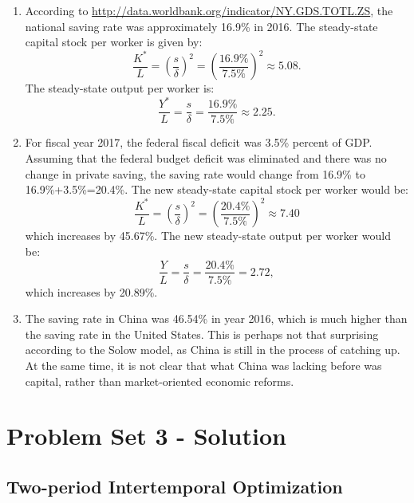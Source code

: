 \documentclass[]{book}
\begin{document}
\begin{enumerate}
\def\labelenumi{\arabic{enumi}.}
\item
  According to \url{http://data.worldbank.org/indicator/NY.GDS.TOTL.ZS},
  the national saving rate was approximately 16.9\% in 2016. The
  steady-state capital stock per worker is given by:
  \[\frac{K^{*}}{L}=\left(\frac{s}{\delta}\right)^{2}=\left(\frac{16.9\%}{7.5\%}\right)^{2} \approx 5.08.\]
  The steady-state output per worker is:
  \[\frac{Y^{*}}{L}=\frac{s}{\delta}=\frac{16.9\%}{7.5\%} \approx 2.25.\]
\item
  For fiscal year 2017, the federal fiscal deficit was 3.5\% percent of
  GDP. Assuming that the federal budget deficit was eliminated and there
  was no change in private saving, the saving rate would change from
  16.9\% to 16.9\%+3.5\%=20.4\%. The new steady-state capital stock per
  worker would be:
  \[\frac{K^{*}}{L}=\left(\frac{s}{\delta}\right)^{2}=\left(\frac{20.4\%}{7.5\%}\right)^{2} \approx  7.40\]
  which increases by 45.67\%. The new steady-state output per worker
  would be: \[\frac{Y}{L}=\frac{s}{\delta}=\frac{20.4\%}{7.5\%}=2.72,\]
  which increases by 20.89\%.
\item
  The saving rate in China was 46.54\% in year 2016, which is much
  higher than the saving rate in the United States. This is perhaps not
  that surprising according to the Solow model, as China is still in the
  process of catching up. At the same time, it is not clear that what
  China was lacking before was capital, rather than market-oriented
  economic reforms.
\end{enumerate}

\hypertarget{pset3-sol}{\chapter{Problem Set 3 -
Solution}\label{pset3-sol}}

\section{Two-period Intertemporal
Optimization}\label{two-period-intertemporal-optimization-1}
\end{document}
